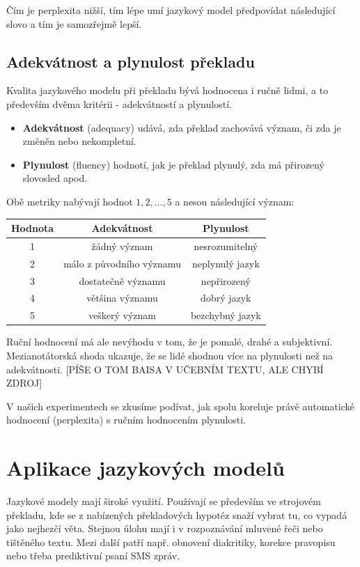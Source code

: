\documentclass[12pt,a4paper]{report}
\begin{document}
Čím je perplexita nižší, tím lépe umí jazykový model předpovídat následující slovo a tím je samozřejmě lepší.

\subsection{Adekvátnost a plynulost překladu}
Kvalita jazykového modelu při překladu bývá hodnocena i ručně lidmi, a to především dvěma kritérii - adekvátností a plynulostí.

\begin{itemize}
\item{\textbf{Adekvátnost} (adequacy) udává, zda překlad zachovává význam, či zda je změněn nebo nekompletní.}
\item{\textbf{Plynulost} (fluency) hodnotí, jak je překlad plynulý, zda má přirozený slovosled apod.}
\end{itemize}

Obě metriky nabývají hodnot $1, 2, \ldots, 5$ a nesou následující význam:
\begin{center}\begin{tabular}{|c|c|c|}
\hline
\textbf{Hodnota} & \textbf{Adekvátnost} & \textbf{Plynulost}\\
\hline
1 & žádný význam & nesrozumitelný \\
\hline
2 & málo z původního významu & neplynulý jazyk \\
\hline
3 & dostatečně významu & nepřirozený \\
\hline
4 & většina významu & dobrý jazyk \\
\hline
5 & veškerý význam & bezchybný jazyk \\
\hline
\end{tabular}\end{center}

Ruční hodnocení má ale nevýhodu v tom, že je pomalé, drahé a subjektivní. Mezianotátorská shoda ukazuje, že se lidé shodnou více na plynulosti než na adekvátnosti. [PÍŠE O TOM BAISA V UČEBNÍM TEXTU, ALE CHYBÍ ZDROJ]

V našich experimentech se zkusíme podívat, jak spolu koreluje právě automatické hodnocení (perplexita) s ručním hodnocením plynulosti.


\section{Aplikace jazykových modelů}
Jazykové modely mají široké využití. Používají se především ve strojovém překladu, kde se z nabízených překladových hypotéz snaží vybrat tu, co vypadá jako nejhezčí věta. Stejnou úlohu mají i v rozpoznávání mluvené řeči nebo tištěného textu. Mezi další patří např. obnovení diakritiky, korekce pravopisu nebo třeba prediktivní psaní SMS zpráv.
\end{document}
